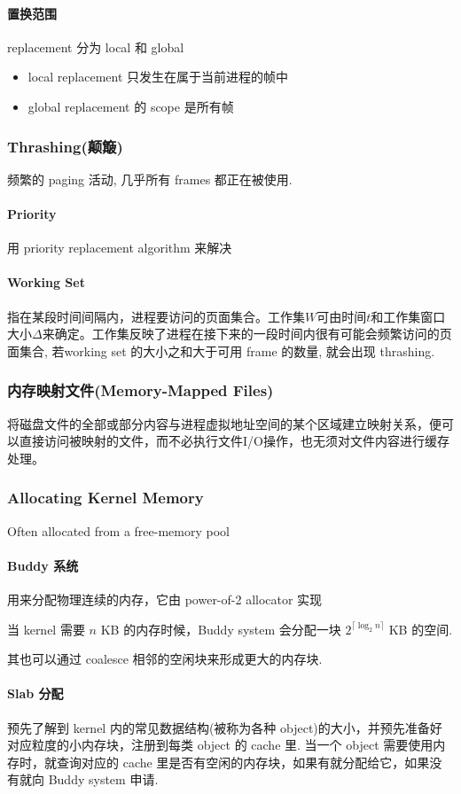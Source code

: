 \paragraph{置换范围}replacement 分为 local 和 global
\begin{itemize}
    \item local replacement 只发生在属于当前进程的帧中
    \item global replacement 的 scope 是所有帧
\end{itemize}

\subsubsection{Thrashing(颠簸)}
频繁的 paging 活动, 几乎所有 frames 都正在被使用. 

\paragraph{Priority}用 priority replacement algorithm 来解决

\paragraph{Working Set}指在某段时间间隔内，进程要访问的页面集合。工作集$W$可由时间$t$和工作集窗口大小$\Delta$来确定。工作集反映了进程在接下来的一段时间内很有可能会频繁访问的页面集合, 若working set 的大小之和大于可用 frame 的数量, 就会出现 thrashing. 

\subsubsection{内存映射文件(Memory-Mapped Files)}
将磁盘文件的全部或部分内容与进程虚拟地址空间的某个区域建立映射关系，便可以直接访问被映射的文件，而不必执行文件I/O操作，也无须对文件内容进行缓存处理。

\subsubsection{Allocating Kernel Memory}
Often allocated from a free-memory pool

\paragraph{Buddy 系统}用来分配物理连续的内存，它由 power-of-2 allocator 实现

当 kernel 需要 $n$ KB 的内存时候，Buddy system 会分配一块 $2^{\lceil \log_2 n \rceil}$ KB 的空间. 

其也可以通过 coalesce 相邻的空闲块来形成更大的内存块. 

\paragraph{Slab 分配}预先了解到 kernel 内的常见数据结构(被称为各种 object)的大小，并预先准备好对应粒度的小内存块，注册到每类 object 的 cache 里. 当一个 object 需要使用内存时，就查询对应的 cache 里是否有空闲的内存块，如果有就分配给它，如果没有就向 Buddy system 申请. 